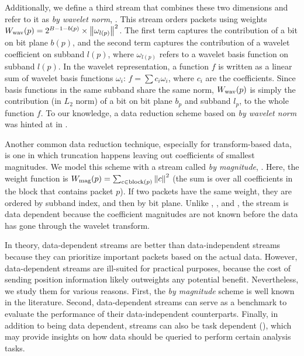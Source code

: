 Additionally, we define a third stream that combines these two dimensions and refer
to it as \emph{by wavelet norm}, \swav.  This stream orders packets using
weights $\wwav(p)=2^{B-1-b(p)}\times \norm{\omega_{l(p)}}^2$. The first term
captures the contribution of a bit on bit plane $b(p)$, and the second term
captures the contribution of a wavelet coefficient on subband $l(p)$, where
$\omega_{l(p)}$ refers to a wavelet basis function on subband $l(p)$. In the
wavelet representation, a function $f$ is written as a linear sum of wavelet
basis functions $\omega_i$: $f=\sum{c_i\omega_i}$, where $c_i$ are the
coefficients. Since basis functions in the same subband share the same norm,
$\wwav(p)$ is simply the contribution (in $L_2$ norm) of a bit on bit plane
$b_p$ and subband $l_p$, to the whole function $f$. To our knowledge, a data
reduction scheme based on \emph{by wavelet norm} was hinted at in
\todo{[CITE]}. 

Another common data reduction technique, especially for transform-based data,
is one in which truncation happens leaving out coefficients of smallest
magnitudes. We model this scheme with a stream called \emph{by magnitude},
\smag. Here, the weight function is $\wmag(p)=\sum_{c\in
\text{block}(p)}\norm{c}^2$ (the sum is over all coefficients in the block that
contains packet $p$). If two packets have the same weight, they are ordered by
subband index, and then by bit plane. Unlike \slvl, \sbit, and \swav, the \smag stream
is data dependent because the coefficient magnitudes are not known before
the data has gone through the wavelet transform.

In theory, data-dependent streams are better than data-independent streams because
they can prioritize important packets based on the actual data.
However, data-dependent streams are ill-suited for practical purposes, because
the cost of sending position information likely outweights any potential
benefit. Nevertheless, we study them for various reasons. First, the \emph{by
magnitude} scheme is well known in the literature. Second, data-dependent
streams can serve as a benchmark to evaluate the performance of their
data-independent counterparts. Finally, in addition to being data dependent,
streams can also be task dependent (), which may
provide insights on how data should be queried to perform certain analysis
tasks.




